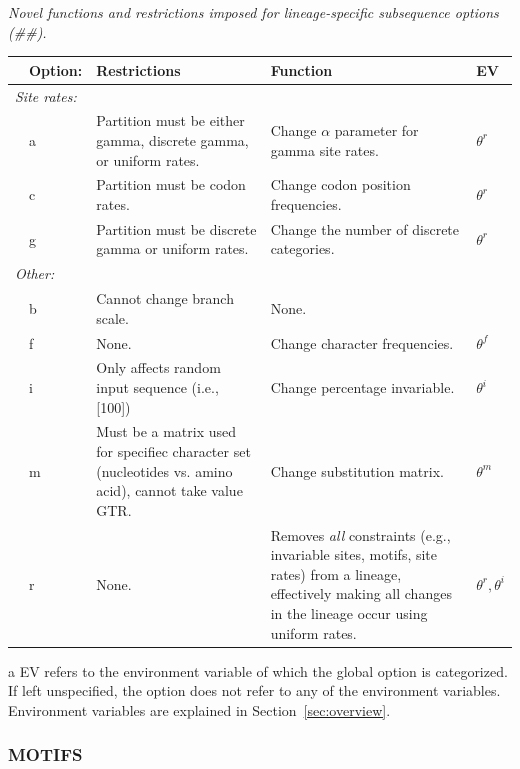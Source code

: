 \documentclass[10pt]{article}
\begin{document}
 \begin{threeparttable}
  \caption{\textit{Novel functions and restrictions imposed for lineage-specific subsequence options (\#\#).}}
  \begin{tabular}{p{0.1in}lp{2.25in}p{2.25in}p{0.5in}}
  \hline\hline
  & Option: & Restrictions & Function & EV\tnote{a}\\
  \hline
   \multicolumn{4}{l}{\it Site rates:} \\
   & a & Partition must be either gamma, discrete gamma, or uniform rates. & Change $\alpha$ parameter for gamma site rates. & $\theta^r$\\
   & c & Partition must be codon rates. & Change codon position frequencies. & $\theta^r$\\
   & g & Partition must be discrete gamma or uniform rates. & Change the number of discrete categories. & $\theta^r$\\
   \multicolumn{4}{l}{\it Other:} \\
   & b & Cannot change branch scale. & None. \\
   & f & None. & Change character frequencies. & $\theta^f$\\
   & i & Only affects random input sequence (i.e., [100]) & Change percentage invariable. & $\theta^i$\\
   & m & Must be a matrix used for specifiec character set (nucleotides vs. amino acid), cannot take value GTR. & Change substitution matrix. & $\theta^m$\\
   & r & None. & Removes \emph{all} constraints (e.g., invariable sites, motifs, site rates) from a lineage, effectively making all changes in the lineage occur using uniform rates. & $\theta^r, \theta^i$\\
  \hline\hline
  \end{tabular}
  \begin{tablenotes}
  \item[a] EV refers to the environment variable of which the global option is categorized. If left unspecified, the option does not refer to any of the environment variables. Environment variables are explained in Section~\ref{sec:overview}.
  \end{tablenotes}
  \label{tab:lineage_options}
 \end{threeparttable}

 \subsubsection{MOTIFS}
\end{document}
